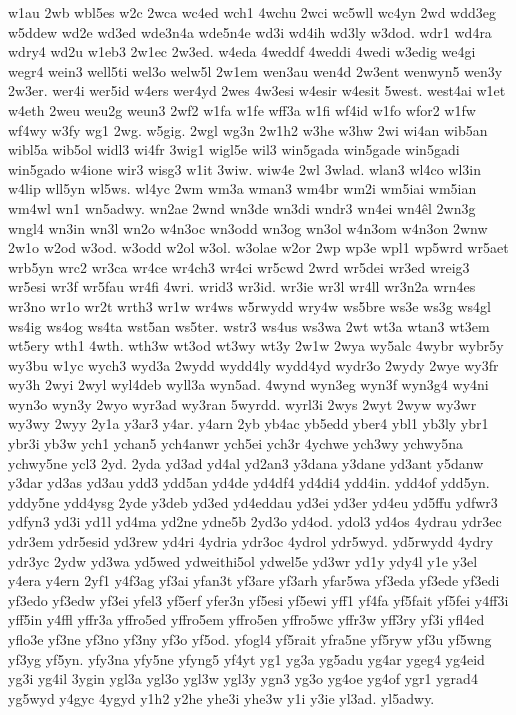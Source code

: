 {w1au
2wb
wbl5es
w2c
2wca
wc4ed
wch1
4wchu
2wci
wc5wll
wc4yn
2wd
wdd3eg
w5ddew
wd2e
wd3ed
wde3n4a
wde5n4e
wd3i
wd4ih
wd3ly
w3dod.
wdr1
wd4ra
wdry4
wd2u
w1eb3
2w1ec
2w3ed.
w4eda
4weddf
4weddi
4wedi
w3edig
we4gi
wegr4
wein3
well5ti
wel3o
welw5l
2w1em
wen3au
wen4d
2w3ent
wenwyn5
wen3y
2w3er.
wer4i
wer5id
w4ers
wer4yd
2wes
4w3esi
w4esir
w4esit
5west.
west4ai
w1et
w4eth
2weu
weu2g
weun3
2wf2
w1fa
w1fe
wff3a
w1fi
wf4id
w1fo
wfor2
w1fw
wf4wy
w3fy
wg1
2wg.
w5gig.
2wgl
wg3n
2w1h2
w3he
w3hw
2wi
wi4an
wib5an
wibl5a
wib5ol
widl3
wi4fr
3wig1
wigl5e
wil3
win5gada
win5gade
win5gadi
win5gado
w4ione
wir3
wisg3
w1it
3wiw.
wiw4e
2wl
3wlad.
wlan3
wl4co
wl3in
w4lip
wll5yn
wl5ws.
wl4yc
2wm
wm3a
wman3
wm4br
wm2i
wm5iai
wm5ian
wm4wl
wn1
wn5adwy.
wn2ae
2wnd
wn3de
wn3di
wndr3
wn4ei
wn4^^eal
2wn3g
wngl4
wn3in
wn3l
wn2o
w4n3oc
wn3odd
wn3og
wn3ol
w4n3om
w4n3on
2wnw
2w1o
w2od
w3od.
w3odd
w2ol
w3ol.
w3olae
w2or
2wp
wp3e
wpl1
wp5wrd
wr5aet
wrb5yn
wrc2
wr3ca
wr4ce
wr4ch3
wr4ci
wr5cwd
2wrd
wr5dei
wr3ed
wreig3
wr5esi
wr3f
wr5fau
wr4fi
4wri.
wrid3
wr3id.
wr3ie
wr3l
wr4ll
wr3n2a
wrn4es
wr3no
wr1o
wr2t
wrth3
wr1w
wr4ws
w5rwydd
wry4w
ws5bre
ws3e
ws3g
ws4gl
ws4ig
ws4og
ws4ta
wst5an
ws5ter.
wstr3
ws4us
ws3wa
2wt
wt3a
wtan3
wt3em
wt5ery
wth1
4wth.
wth3w
wt3od
wt3wy
wt3y
2w1w
2wya
wy5alc
4wybr
wybr5y
wy3bu
w1yc
wych3
wyd3a
2wydd
wydd4ly
wydd4yd
wydr3o
2wydy
2wye
wy3fr
wy3h
2wyi
2wyl
wyl4deb
wyll3a
wyn5ad.
4wynd
wyn3eg
wyn3f
wyn3g4
wy4ni
wyn3o
wyn3y
2wyo
wyr3ad
wy3ran
5wyrdd.
wyrl3i
2wys
2wyt
2wyw
wy3wr
wy3wy
2wyy
2y1a
y3ar3
y4ar.
y4arn
2yb
yb4ac
yb5edd
yber4
ybl1
yb3ly
ybr1
ybr3i
yb3w
ych1
ychan5
ych4anwr
ych5ei
ych3r
4ychwe
ych3wy
ychwy5na
ychwy5ne
ycl3
2yd.
2yda
yd3ad
yd4al
yd2an3
y3dana
y3dane
yd3ant
y5danw
y3dar
yd3as
yd3au
ydd3
ydd5an
yd4de
yd4df4
yd4di4
ydd4in.
ydd4of
ydd5yn.
yddy5ne
ydd4ysg
2yde
y3deb
yd3ed
yd4eddau
yd3ei
yd3er
yd4eu
yd5ffu
ydfwr3
ydfyn3
yd3i
yd1l
yd4ma
yd2ne
ydne5b
2yd3o
yd4od.
ydol3
yd4os
4ydrau
ydr3ec
ydr3em
ydr5esid
yd3rew
yd4ri
4ydria
ydr3oc
4ydrol
ydr5wyd.
yd5rwydd
4ydry
ydr3yc
2ydw
yd3wa
yd5wed
ydweithi5ol
ydwel5e
yd3wr
yd1y
ydy4l
y1e
y3el
y4era
y4ern
2yf1
y4f3ag
yf3ai
yfan3t
yf3are
yf3arh
yfar5wa
yf3eda
yf3ede
yf3edi
yf3edo
yf3edw
yf3ei
yfel3
yf5erf
yfer3n
yf5esi
yf5ewi
yff1
yf4fa
yf5fait
yf5fei
y4ff3i
yff5in
y4ffl
yffr3a
yffro5ed
yffro5em
yffro5en
yffro5wc
yffr3w
yff3ry
yf3i
yfl4ed
yflo3e
yf3ne
yf3no
yf3ny
yf3o
yf5od.
yfogl4
yf5rait
yfra5ne
yf5ryw
yf3u
yf5wng
yf3yg
yf5yn.
yfy3na
yfy5ne
yfyng5
yf4yt
yg1
yg3a
yg5adu
yg4ar
ygeg4
yg4eid
yg3i
yg4il
3ygin
ygl3a
ygl3o
ygl3w
ygl3y
ygn3
yg3o
yg4oe
yg4of
ygr1
ygrad4
yg5wyd
y4gyc
4ygyd
y1h2
y2he
yhe3i
yhe3w
y1i
y3ie
yl3ad.
yl5adwy.
}
